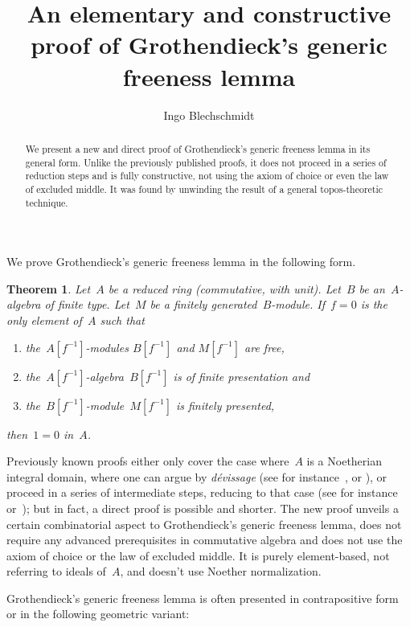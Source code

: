\documentclass[oneside]{amsart}
\title[Grothendieck's generic freeness lemma]{An elementary and constructive
proof of Grothendieck's generic freeness lemma}
\author{Ingo Blechschmidt}
\theoremstyle{definition}
\theoremstyle{plain}
\newtheorem{thm}[defn]{Theorem}
\theoremstyle{remark}
\newcommand{\stacksproject}[1]{\cite[{\href{https://stacks.math.columbia.edu/tag/#1}{Tag~#1}}]{stacks-project}}
\begin{document}
\begin{abstract}
  We present a new and direct proof of Grothendieck's generic freeness
  lemma in its general form. Unlike the previously published proofs, it does not
  proceed in a series of reduction steps and is fully constructive, not
  using the axiom of choice or even the law of excluded middle. It was
  found by unwinding the result of a general topos-theoretic technique.
\end{abstract}

\maketitle
\thispagestyle{empty}

\noindent
We prove Grothendieck's generic freeness lemma in the
following form.

\begin{thm}\label{thm:algebraic}Let~$A$ be a reduced ring (commutative, with unit). Let~$B$ be
an~$A$-algebra of finite type. Let~$M$ be a finitely generated~$B$-module.
If~$f = 0$ is the only element of~$A$ such that
\begin{enumerate}
\item the~$A[f^{-1}]$-modules $B[f^{-1}]$ and $M[f^{-1}]$ are free,
\item the~$A[f^{-1}]$-algebra~$B[f^{-1}]$ is of finite presentation and
\item the~$B[f^{-1}]$-module~$M[f^{-1}]$ is finitely presented,
\end{enumerate}
then~$1 = 0$ in~$A$.
\end{thm}

Previously known proofs either only cover the case where~$A$ is a Noetherian
integral domain, where one can argue by \emph{dévissage} (see for
instance~\cite[Lemme~6.9.2]{ega-4-2},
\cite[Thm.~24.1]{matsumura:commutative-ring-theory} or
\cite[Thm.~14.4]{eisenbud:commutative-algebra}), or proceed in a series of
intermediate steps, reducing to that case (see for
instance~\cite{staats:generic-freeness} or~\stacksproject{051Q}); but in fact,
a direct proof is possible and shorter. The new proof unveils a certain
combinatorial aspect to Grothendieck's generic freeness lemma, does not require
any advanced prerequisites in commutative algebra and does not use the axiom of
choice or the law of excluded middle. It is purely element-based, not referring
to ideals of~$A$, and doesn't use Noether normalization.

Grothendieck's generic freeness lemma is often presented in contrapositive form
or in the following geometric variant:
\end{document}
